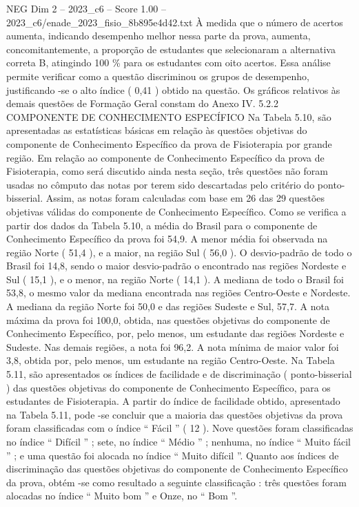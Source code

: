 \begin{textsample}{NEG Dim 2 – 2023\_c6 – Score 1.00 – 2023\_c6/enade\_2023\_fisio\_8b895e4d42.txt}
À medida que o número de acertos aumenta, indicando desempenho melhor nessa parte da prova, aumenta, concomitantemente, a proporção de estudantes que selecionaram a alternativa correta B, atingindo 100 \% para os estudantes com oito acertos.
Essa análise permite verificar como a questão discriminou os grupos de desempenho, justificando -se o alto índice ( 0,41 ) obtido na questão.
Os gráficos relativos às demais questões de Formação Geral constam do Anexo IV. 5.2.2 COMPONENTE DE CONHECIMENTO ESPECÍFICO Na Tabela 5.10, são apresentadas as estatísticas básicas em relação às questões objetivas do componente de Conhecimento Específico da prova de Fisioterapia por grande região.
Em relação ao componente de Conhecimento Específico da prova de Fisioterapia, como será discutido ainda nesta seção, três questões não foram usadas no cômputo das notas por terem sido descartadas pelo critério do ponto-bisserial.
Assim, as notas foram calculadas com base em 26 das 29 questões objetivas válidas do componente de Conhecimento Específico.
Como se verifica a partir dos dados da Tabela 5.10, a média do Brasil para o componente de Conhecimento Específico da prova foi 54,9.
A menor média foi observada na região Norte ( 51,4 ), e a maior, na região Sul ( 56,0 ).
O desvio-padrão de todo o Brasil foi 14,8, sendo o maior desvio-padrão o encontrado nas regiões Nordeste e Sul ( 15,1 ), e o menor, na região Norte ( 14,1 ).
A mediana de todo o Brasil foi 53,8, o mesmo valor da mediana encontrada nas regiões Centro-Oeste e Nordeste.
A mediana da região Norte foi 50,0 e das regiões Sudeste e Sul, 57,7.
A nota máxima da prova foi 100,0, obtida, nas questões objetivas do componente de Conhecimento Específico, por, pelo menos, um estudante das regiões Nordeste e Sudeste.
Nas demais regiões, a nota foi 96,2.
A nota mínima de maior valor foi 3,8, obtida por, pelo menos, um estudante na região Centro-Oeste.
Na Tabela 5.11, são apresentados os índices de facilidade e de discriminação ( ponto-bisserial ) das questões objetivas do componente de Conhecimento Específico, para os estudantes de Fisioterapia.
A partir do índice de facilidade obtido, apresentado na Tabela 5.11, pode -se concluir que a maioria das questões objetivas da prova foram classificadas com o índice “ Fácil ” ( 12 ).
Nove questões foram classificadas no índice “ Difícil ” ; sete, no índice “ Médio ” ; nenhuma, no índice “ Muito fácil ” ; e uma questão foi alocada no índice “ Muito difícil ”.
Quanto aos índices de discriminação das questões objetivas do componente de Conhecimento Específico da prova, obtém -se como resultado a seguinte classificação : três questões foram alocadas no índice “ Muito bom ” e Onze, no “ Bom ”.

\end{textsample}
